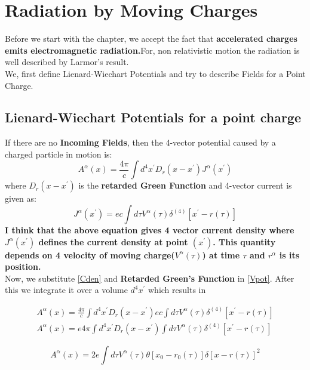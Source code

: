 \documentclass[12pt]{report}
\newcommand{\rr}[1]{\left[{#1}\right]}
\begin{document}
\section{Radiation by Moving Charges}
Before we start with the chapter, we accept the fact that \textbf{accelerated charges emits electromagnetic radiation.}For, non relativistic motion the radiation is well described by Larmor's result.\\
We, first define Lienard-Wiechart Potentials and try to describe Fields for a Point Charge.
\subsection{Lienard-Wiechart Potentials for a point charge}
If there are no \textbf{Incoming Fields}, then the 4-vector potential caused by a charged particle in motion is:
\begin{equation}\label{Vpot}
A^\alpha(x)=\frac{4 \pi}{c}\int d^4x^\prime D_r(x-x^\prime)J^\alpha(x^\prime)
\end{equation}
where $D_r(x-x^\prime)$ is the \textbf{retarded Green Function} and 4-vector current is given as:
\begin{equation}\label{Cden}
J^\alpha(x^\prime)=ec\int d\tau V^\alpha(\tau)\delta^{(4)}\rr{x^\prime-r(\tau)}
\end{equation}
\textbf{I think that the above equation gives 4 vector current density where $J^{\alpha}(x^\prime)$ defines the current density at point $(x^\prime)$. This quantity depends on 4 velocity of moving charge($V^\alpha(\tau)$) at time $\tau$ and $r^\alpha$ is its position.}\\

Now, we substitute \eqref{Cden} and \textbf{Retarded Green's Function} in \eqref{Vpot}. After this we integrate it over a volume $d^4 x^\prime$ which results in

\begin{eqnarray*}
A^\alpha(x)=\frac{4 \pi}{c}\int d^4x^\prime D_r(x-x^\prime)ec\int d\tau V^\alpha(\tau)\delta^{(4)}\rr{x^\prime-r(\tau)}\\
A^\alpha(x)=e4 \pi\int d^4x^\prime D_r(x-x^\prime)\int d\tau V^\alpha(\tau)\delta^{(4)}\rr{x^\prime-r(\tau)}
\end{eqnarray*}



\begin{equation}\label{Vpotf}
A^\alpha(x)=2e\int d\tau V^\alpha(\tau)\theta\rr{x_0-r_0(\tau)}\delta\rr{x-r(\tau)}^2
\end{equation}
\end{document}
